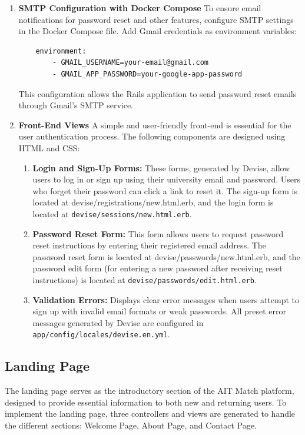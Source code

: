 \begin{enumerate}
\begin{enumerate}
    \end{enumerate}

    \item \textbf{SMTP Configuration with Docker Compose}
    To ensure email notifications for password reset and other features, configure SMTP settings in the Docker Compose file. Add Gmail credentials as environment variables:
\begin{lstlisting}
    environment:
        - GMAIL_USERNAME=your-email@gmail.com
        - GMAIL_APP_PASSWORD=your-google-app-password
\end{lstlisting}
    This configuration allows the Rails application to send password reset emails through Gmail’s SMTP service.
    
    \newpage
    \item \textbf{Front-End Views}
    A simple and user-friendly front-end is essential for the user authentication process. The following components are designed using HTML and CSS:

    \begin{enumerate}
        \item \textbf{Login and Sign-Up Forms:} These forms, generated by Devise, allow users to log in or sign up using their university email and password. Users who forget their password can click a link to reset it. The sign-up form is located at devise/registrations/new.html.erb, and the login form is located at \texttt{devise/sessions/new.html.erb}.
        
        \item \textbf{Password Reset Form:} This form allows users to request password reset instructions by entering their registered email address. The password reset form is located at devise/passwords/new.html.erb, and the password edit form (for entering a new password after receiving reset instructions) is located at \texttt{devise/passwords/edit.html.erb}.
        
        \item \textbf{Validation Errors:} Displays clear error messages when users attempt to sign up with invalid email formats or weak passwords. All preset error messages generated by Devise are configured in \texttt{app/config/locales/devise.en.yml}.
    \end{enumerate}
\end{enumerate}
\clearpage
\subsection{Landing Page}
The landing page serves as the introductory section of the AIT Match platform, designed to provide essential information to both new and returning users. To implement the landing page, three controllers and views are generated to handle the different sections: Welcome Page, About Page, and Contact Page.

